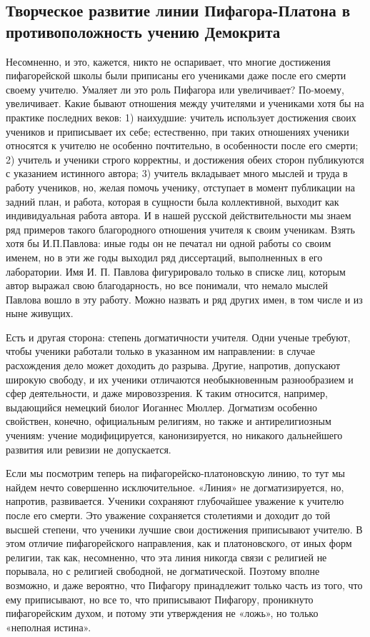 \subsection{Творческое     развитие    линии     Пифагора-Платона    в
противоположность учению Демокрита}

Несомненно, и это, кажется, никто не оспаривает, что многие достижения
пифагорейской  школы  были  приписаны  его учениками  даже  после  его
смерти своему учителю.  Умаляет ли это роль  Пифагора или увеличивает?
По-моему,  увеличивает.  Какие  бывают  отношения  между  учителями  и
учениками  хотя   бы  на  практике  последних   веков:  1)  наихудшие:
учитель использует  достижения своих  учеников и приписывает  их себе;
естественно,  при  таких отношениях  ученики  относятся  к учителю  не
особенно почтительно,  в особенности  после его  смерти; 2)  учитель и
ученики  строго корректны,  и  достижения обеих  сторон публикуются  с
указанием  истинного  автора; 3)  учитель  вкладывает  много мыслей  и
труда  в  работу  учеников,  но, желая  помочь  ученику,  отступает  в
момент публикации  на задний план,  и работа, которая в  сущности была
коллективной,  выходит как  индивидуальная  работа автора.  И в  нашей
русской  действительности мы  знаем ряд  примеров такого  благородного
отношения учителя  к своим ученикам.  Взять хотя бы  И.П.Павлова: иные
годы он не печатал  ни одной работы со своим именем, но  в эти же годы
выходил  ряд диссертаций,  выполненных в  его лаборатории.  Имя И.  П.
Павлова фигурировало только  в списке лиц, которым  автор выражал свою
благодарность, но все понимали, что  немало мыслей Павлова вошло в эту
работу.  Можно назвать  и  ряд других  имен,  в том  числе  и из  ныне
живущих.

Есть  и другая  сторона:  степень догматичности  учителя. Одни  ученые
требуют, чтобы ученики  работали только в указанном  им направлении: в
случае расхождения  дело может доходить до  разрыва. Другие, напротив,
допускают  широкую свободу,  и  их  ученики отличаются  необыкновенным
разнообразием  и  сфер деятельности,  и  даже  мировоззрения. К  таким
относится,  например,  выдающийся  немецкий  биолог  Иоганнес  Мюллер.
Догматизм особенно свойствен, конечно,  официальным религиям, но также
и антирелигиозным  учениям: учение модифицируется,  канонизируется, но
никакого дальнейшего развития или ревизии не допускается.

Если мы посмотрим теперь на пифагорейско-платоновскую линию, то тут мы
найдем  нечто совершенно  исключительное. «Линия»  не догматизируется,
но, напротив,  развивается. Ученики  сохраняют глубочайшее  уважение к
учителю  после  его  смерти.  Это уважение  сохраняется  столетиями  и
доходит  до той  высшей степени,  что ученики  лучшие свои  достижения
приписывают учителю. В этом  отличие пифагорейского направления, как и
платоновского,  от иных  форм религии,  так как,  несомненно, что  эта
линия никогда связи  с религией не порывала, но  с религией свободной,
не  догматической.  Поэтому  вполне  возможно, и  даже  вероятно,  что
Пифагору принадлежит только часть из того, что ему приписывают, но все
то, что приписывают Пифагору, проникнуто пифагорейским духом, и потому
эти утверждения не «ложь», но только «неполная истина».

